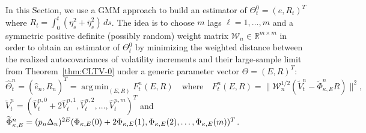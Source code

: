 \documentclass[ecta,nameyear,draft]{econsocart}
\def\wt{\widetilde}
\def\wh{\widehat}
\DeclareMathOperator*{\argmin}{arg\,min}
\newcommand{\1}{\mathbf 1}
\def\bbR{\mathbb{R}}
\newcommand{\calW}{\mathcal{W}}
\newcommand{\calZ}{\mathcal{Z}}
\numberwithin{equation}{section}
\newcommand{\ov}{\overline}
\begin{document}
In this Section, we use a GMM approach to build an estimator of $\Theta^0_t = (e, R_t)^T$ where $R_t = \int_0^t (\eta_s^2+\ov \eta_s^2)\,ds$. The idea is to choose $m$   lags $\ell=1, \dots, m$
and a symmetric positive definite (possibly random) weight matrix $\calW_n \in \bbR^{m\times m}$ in order to obtain an estimator of $\Theta^0_t$ by minimizing the weighted distance between the realized autocovariances of volatility increments and their large-sample limit from Theorem~\ref{thm:CLTV-0} under a generic parameter vector $\Theta = (E,R)^T$:
\begin{equation*}
    \wh\Theta^n_t=(\wh e_n, \wh R_n)^T
    =
    \argmin_{(E, R)}
   F^n_t(E,R) \quad \text{where}\quad  F^n_t(E,R) 
    = \|
    \calW^{1/2}_n (
    \wt V^{n}_t 
    - 
    \wt\Phi^n_{\kappa, E} R
    )
    \|^2,
\end{equation*}
 $\wt V^{n}_t = (\wh V^{n, 0}_t
+
2
\wh V^{n, 1}_t, \wh V^{n, 2}_t,\dots, \wh V^{n, m}_t)^T$ and $\wt\Phi^n_{\kappa, E} =(p_n\Delta_n)^{2E}  (\Phi_{\kappa,E}(0)+2\Phi_{\kappa,E}(1),\linebreak \Phi_{\kappa, E}(2),\ldots, \Phi_{\kappa, E}(m))^T$.
\end{document}
